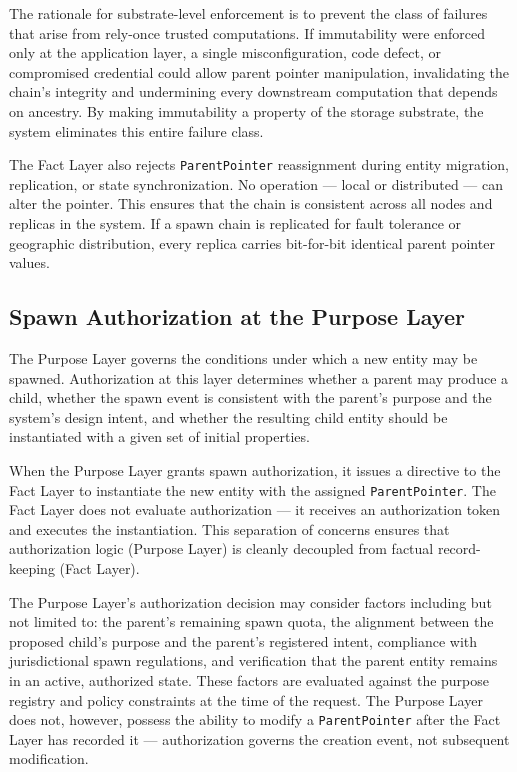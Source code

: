 The rationale for substrate-level enforcement is to prevent the class of failures that arise from rely-once trusted computations. If immutability were enforced only at the application layer, a single misconfiguration, code defect, or compromised credential could allow parent pointer manipulation, invalidating the chain's integrity and undermining every downstream computation that depends on ancestry. By making immutability a property of the storage substrate, the system eliminates this entire failure class.

The Fact Layer also rejects \texttt{ParentPointer} reassignment during entity migration, replication, or state synchronization. No operation — local or distributed — can alter the pointer. This ensures that the chain is consistent across all nodes and replicas in the system. If a spawn chain is replicated for fault tolerance or geographic distribution, every replica carries bit-for-bit identical parent pointer values.

\subsection{Spawn Authorization at the Purpose Layer}

The Purpose Layer governs the conditions under which a new entity may be spawned. Authorization at this layer determines whether a parent may produce a child, whether the spawn event is consistent with the parent's purpose and the system's design intent, and whether the resulting child entity should be instantiated with a given set of initial properties.

When the Purpose Layer grants spawn authorization, it issues a directive to the Fact Layer to instantiate the new entity with the assigned \texttt{ParentPointer}. The Fact Layer does not evaluate authorization — it receives an authorization token and executes the instantiation. This separation of concerns ensures that authorization logic (Purpose Layer) is cleanly decoupled from factual record-keeping (Fact Layer).

The Purpose Layer's authorization decision may consider factors including but not limited to: the parent's remaining spawn quota, the alignment between the proposed child's purpose and the parent's registered intent, compliance with jurisdictional spawn regulations, and verification that the parent entity remains in an active, authorized state. These factors are evaluated against the purpose registry and policy constraints at the time of the request. The Purpose Layer does not, however, possess the ability to modify a \texttt{ParentPointer} after the Fact Layer has recorded it — authorization governs the creation event, not subsequent modification.

